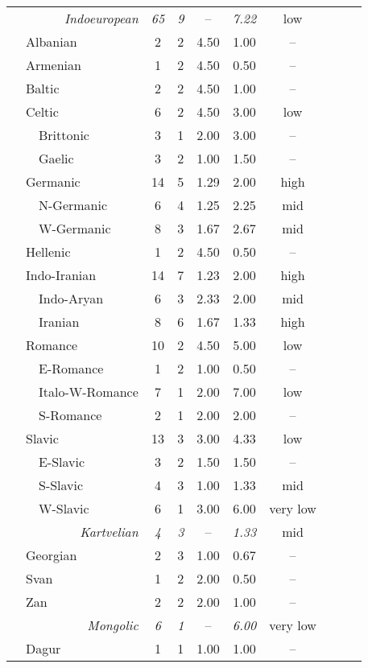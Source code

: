 \begin{footnotesize}
\begin{longtable}[h]{l l l || c || c | c | c || c c c | c}
\multicolumn{3}{r||}{\textit{Indoeuropean}}&\textit{65}&\textit{9}&–&\textit{7.22}	&low\\
&\multicolumn{2}{l||}{Albanian}		&2		&2		&4.50	&1.00	&–\\
&\multicolumn{2}{l||}{Armenian}		&1		&2		&4.50	&0.50	&–\\
&\multicolumn{2}{l||}{Baltic}		&2		&2		&4.50	&1.00	&–\\
&\multicolumn{2}{l||}{Celtic}		&6		&2		&4.50	&3.00	&low\\
&&Brittonic					&3 		&1		&2.00	&3.00	&–\\
&&Gaelic						&3 		&2		&1.00	&1.50	&–\\
&\multicolumn{2}{l||}{Germanic}		&14		&5		&1.29	&2.00	&high\\
&&N-Germanic					&6		&4		&1.25	&2.25	&mid\\
&&W-Germanic 				&8		&3		&1.67	&2.67	&mid\\
&\multicolumn{2}{l||}{Hellenic}		&1		&2		&4.50	&0.50	&–\\
&\multicolumn{2}{l||}{Indo-Iranian}	&14		&7		&1.23	&2.00	&high\\		
&&Indo-Aryan					&6		&3		&2.33	&2.00	&mid\\
&&Iranian						&8		&6		&1.67	&1.33	&high\\
&\multicolumn{2}{l||}{Romance}		&10		&2		&4.50	&5.00	&low\\
&&E-Romance					&1		&2		&1.00	&0.50	&–\\
&&Italo-W-Romance				&7		&1		&2.00	&7.00	&low\\
&&S-Romance					&2		&1		&2.00	&2.00	&–\\	
&\multicolumn{2}{l||}{Slavic}		&13		&3		&3.00	&4.33	&low\\
&&E-Slavic					&3		&2		&1.50	&1.50	&–\\
&&S-Slavic					&4		&3		&1.00	&1.33	&mid\\
&&W-Slavic					&6		&1		&3.00	&6.00	&very low\\
\hline
\multicolumn{3}{r||}{\textit{Kartvelian}}&\textit{4}	&\textit{3}	&–	&\textit{1.33}	&mid\\
&\multicolumn{2}{l||}{Georgian}		&2		&3		&1.00	&0.67	&–\\
&\multicolumn{2}{l||}{Svan}		&1		&2		&2.00	&0.50	&–\\
&\multicolumn{2}{l||}{Zan}			&2		&2		&2.00	&1.00	&–\\
\hline
\multicolumn{3}{r||}{\textit{Mongolic}}&\textit{6}&\textit{1}&–&\textit{6.00}		&very low\\
&\multicolumn{2}{l||}{Dagur}		&1		&1		&1.00	&1.00	&–\\

\end{longtable}
\end{footnotesize}
